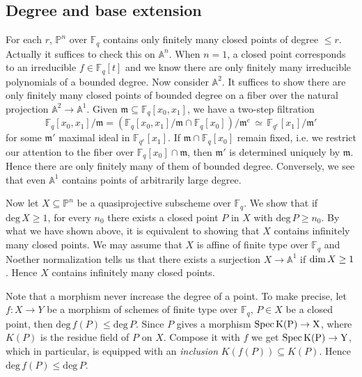 \documentclass[12pt]{article}
\theoremstyle{plain}
\theoremstyle{definition}
\newcommand{\fm}{\mathfrak{m}}
\newcommand{\IA}{\mathbb{A}}
\newcommand{\IF}{\mathbb{F}}
\newcommand{\IP}{\mathbb{P}}
\renewcommand{\deg}{\mathrm{deg}\,}
\newcommand{\Spec}{\rm Spec\,}
\renewcommand\dim{{\rm dim\,}}
\newcommand\iso{{\, \simeq \,}}
\newcommand{\<}{\langle}
\renewcommand{\>}{\rangle}
\begin{document}
\subsection{Degree and base extension}
For each $r$, $\IP^n$ over $\IF_q$ contains only finitely many closed points of degree $\le r$. Actually it suffices to check this on $\IA^n$. When $n = 1$, a closed point corresponds to an irreducible $f \in \IF_q[t]$ and we know there are only finitely many irreducible polynomials of a bounded degree. Now consider $\IA^2$. It suffices to show there are only finitely many closed points of bounded degree on a fiber over the natural projection $\IA^2 \to \IA^1$. Given $\fm \subseteq \IF_q[x_0, x_1]$, we have a two-step filtration 
$$\IF_q[x_0, x_1]/\fm = (\IF_q[x_0, x_1]/\fm \cap \IF_q[x_0])/\fm^e \iso \IF_{q^e}[x_1]/\fm'$$ for some $\fm'$ maximal ideal in $\IF_{q^e}[x_1]$. If $\fm \cap \IF_q[x_0]$ remain fixed, i.e. we restrict our attention to the fiber over $\IF_q[x_0] \cap \fm$, then $\fm'$ is determined uniquely by $\fm$. Hence there are only finitely many of them of bounded degree. Conversely, we see that even $\IA^1$ contains points of arbitrarily large degree. 
\par Now let $X \subseteq \IP^n$ be a quasiprojective subscheme over $\IF_q$. We show that if $\deg X \ge 1$, for every $n_0$ there exists a closed point $P$ in $X$ with $\deg P \ge n_0$. By what we have shown above, it is equivalent to showing that $X$ contains infinitely many closed points. We may assume that $X$ is affine of finite type over $\IF_q$ and Noether normalization tells us that there exists a surjection $X \to \IA^1$ if $\dim X \ge 1$. Hence $X$ contains infinitely many closed points. 
\par Note that a morphism never increase the degree of a point. To make precise, let $f : X \to Y$ be a morphism of schemes of finite type over $\IF_q$, $P \in X$ be a closed point, then $\deg f(P) \le \deg P$. Since $P$ gives a morphism $\Spec K(P) \to X$, where $K(P)$ is the residue field of $P$ on $X$. Compose it with $f$ we get $\Spec K(P) \to Y$, which in particular, is equipped with an \textit{inclusion} $K(f(P)) \subseteq K(P)$. Hence $\deg f(P) \le \deg P$. 
\end{document}
